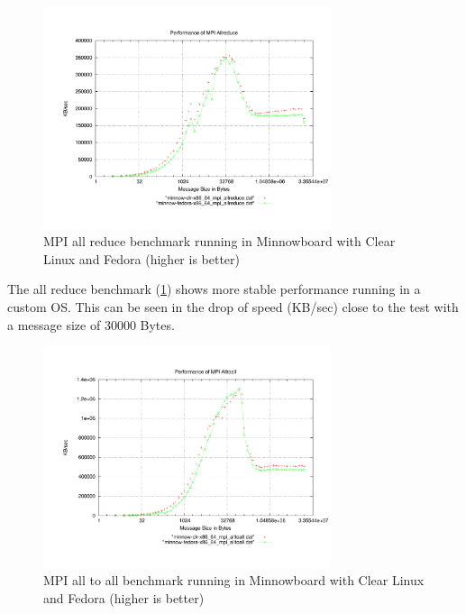 \begin{figure}[H]
\centering
\includegraphics[width=0.75\textwidth]{images/mpbench_clr_experiments/mpi_allreduce.pdf}
\caption{MPI all reduce benchmark running in Minnowboard with Clear Linux and
Fedora (higher is better)}
\label{mpi_allreduce_clr_fedora}
\end{figure}

The all reduce benchmark (\ref{mpi_allreduce_clr_fedora}) shows more stable
performance running in a custom OS.  This can be seen in the drop of speed
(KB/sec) close to the test with a message size of 30000 Bytes. 

\begin{figure}[H]
\centering
\includegraphics[width=0.75\textwidth]{images/mpbench_clr_experiments/mpi_alltoall.pdf}
\caption{MPI all to all benchmark running in Minnowboard with Clear Linux and
Fedora (higher is better)}
\label{mpi_alltoall_clr_fedora}
\end{figure}


